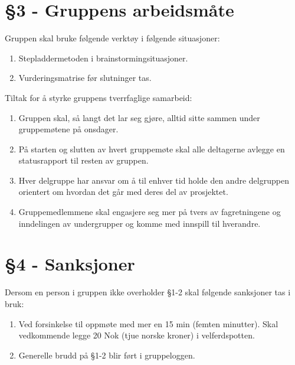 \section*{§3 - Gruppens arbeidsmåte}
Gruppen skal bruke følgende verktøy i følgende situasjoner:
\begin{enumerate}
\item Stepladdermetoden i brainstormingsituasjoner.
\item Vurderingsmatrise før slutninger tas.
\end{enumerate}
Tiltak for å styrke gruppens tverrfaglige samarbeid:
\begin{enumerate}
\item Gruppen skal, så langt det lar seg gjøre, alltid sitte sammen under gruppemøtene på onsdager.
\item På starten og slutten av hvert gruppemøte skal alle deltagerne avlegge en statusrapport til resten av gruppen.
\item Hver delgruppe har ansvar om å til enhver tid holde den andre delgruppen orientert om hvordan det går med deres del av prosjektet. 
\item Gruppemedlemmene skal engasjere seg mer på tvers av fagretningene og inndelingen av undergrupper og komme med innspill til hverandre. 
\end{enumerate}
\section*{§4 - Sanksjoner}
Dersom en person i gruppen ikke overholder §1-2 skal følgende sanksjoner tas i bruk:
\begin{enumerate}
\item Ved forsinkelse til oppmøte med mer en 15 min (femten minutter). Skal vedkommende legge 20 Nok (tjue norske kroner) i velferdspotten. 
\item Generelle brudd på §1-2 blir ført i gruppeloggen. 
\end{enumerate}
